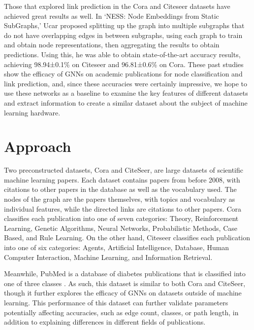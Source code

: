 \documentclass[conference]{IEEEtran}
\begin{document}
Those that explored link prediction in the Cora and Citeseer datasets have achieved great results as well. 
In ‘NESS: Node Embeddings from Static SubGraphs,’ Ucar proposed splitting up the graph into multiple subgraphs 
that do not have overlapping edges in between subgraphs, using each graph to train and obtain node representations, 
then aggregating the results to obtain predictions. Using this, he was able to obtain state-of-the-art accuracy results, 
achieving 98.94±0.1\% on Citeseer and 96.81±0.6\% on Cora. \cite{Ucar}
These past studies show the efficacy of GNNs on academic publications for node classification and link prediction, and, 
since these accuracies were certainly impressive, we hope to use these networks as a baseline to examine the key features 
of different datasets and extract information to create a similar dataset about the subject of machine learning hardware.  \par

\section{Approach}

Two preconstructed datasets, Cora and CiteSeer, are large datasets of scientific machine learning papers. 
Each dataset contains papers from before 2008, with citations to other papers in the database as well as the 
vocabulary used. The nodes of the graph are the papers themselves, with topics and vocabulary as individual features, 
while the directed links are citations to other papers. Cora classifies each publication into one of seven categories: 
Theory, Reinforcement Learning, Genetic Algorithms, Neural Networks, Probabilistic Methods, Case Based, and Rule Learning. 
On the other hand, Citeseer classifies each publication into one of six categories: Agents, Artificial Intelligence, Database, 
Human Computer Interaction, Machine Learning, and Information Retrieval. \par

Meanwhile, PubMed is a database of diabetes publications that is classified into one of three classes \cite{Pubmed}. As such, this 
dataset is similar to both Cora and CiteSeer, though it further explores the efficacy of GNNs on datasets outside of 
machine learning. This performance of this dataset can further validate parameters potentially affecting accuracies, 
such as edge count, classes, or path length,  in addition to explaining differences in different fields of publications. \par
\end{document}
